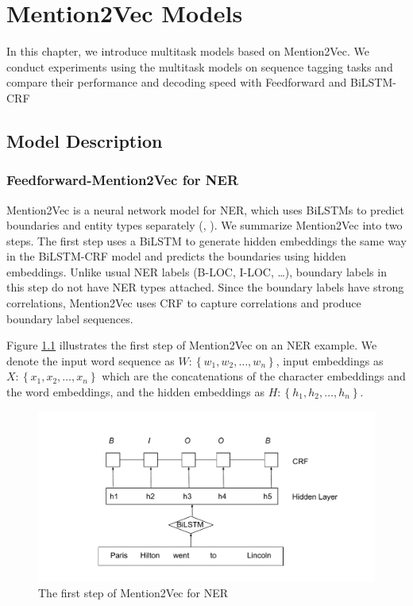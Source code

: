 \chapter{Mention2Vec Models}

In this chapter, we introduce multitask models based on Mention2Vec. We conduct experiments using the multitask models on sequence tagging tasks and compare their performance and decoding speed with Feedforward and BiLSTM-CRF

\section{Model Description}

\subsection{Feedforward-Mention2Vec for NER}

Mention2Vec is a neural network model for NER, which uses BiLSTMs to predict boundaries and entity types separately (\citeauthor{stratos2016mention2vec}, \citeyear{stratos2016mention2vec}). We summarize Mention2Vec into two steps. The first step uses a BiLSTM to generate hidden embeddings the same way in the BiLSTM-CRF model and predicts the boundaries using hidden embeddings. Unlike usual NER labels (B-LOC, I-LOC, \dots), boundary labels in this step do not have NER types attached. Since the boundary labels have strong correlations, Mention2Vec uses CRF to capture correlations and produce boundary label sequences.

Figure \ref{fig:mention2vec1} illustrates the first step of Mention2Vec on an NER example. We denote the input word sequence as $W: \left\{w_{1}, w_{2}, \dots, w_{n}\right\}$, input embeddings as $X: \left\{x_{1}, x_{2}, \dots, x_{n}\right\}$ which are the concatenations of the character embeddings and the word embeddings, and the hidden embeddings as $H: \left\{h_{1}, h_{2}, \dots, h_{n}\right\}$. 

\begin{figure}
  \centering
  \includegraphics[scale=0.6]{mention2vec1.pdf}
 \caption{The first step of Mention2Vec for NER}
  \label{fig:mention2vec1}
\end{figure}

